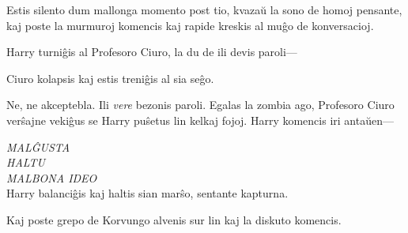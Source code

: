 Estis silento dum mallonga momento post tio, kvazaŭ la sono de homoj
pensante, kaj poste la murmuroj komencis kaj rapide kreskis al muĝo de
konversacioj.

Harry turniĝis al Profesoro Ciuro, la du de ili devis paroli—

Ciuro kolapsis kaj estis treniĝis al sia seĝo.

Ne, ne akceptebla. Ili \emph{vere} bezonis paroli. Egalas la zombia
ago, Profesoro Ciuro verŝajne vekiĝus se Harry puŝetus lin kelkaj
fojoj. Harry komencis iri antaŭen—

\emph{MALĜUSTA} \\
\emph{HALTU} \\
\emph{MALBONA IDEO} \\

Harry balanciĝis kaj haltis sian marŝo, sentante kapturna.

Kaj poste grepo de Korvungo alvenis sur lin kaj la diskuto komencis.

























